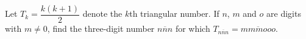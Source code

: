 Let $T_k=\dfrac{k(k+1)}{2}$ denote the $k$th triangular number. If $n$, $m$ and $o$ are digits with $m\ne0$, find the three-digit number $\overline{nnn}$ for which $T_{\overline{nnn}}=\overline{mmmooo}$.
